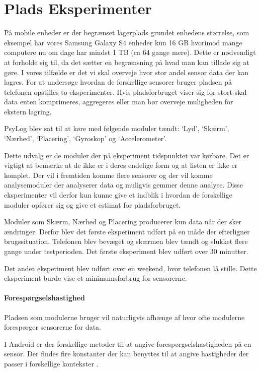 \section{Plads Eksperimenter}
På mobile enheder er der begrænset lagerplads grundet enhedens størrelse, som eksempel har vores Samsung Galaxy S4 enheder kun 16 GB hvorimod mange computere nu om dage har mindst 1 TB (ca 64 gange mere).
Dette er nødvendigt at forholde sig til, da det sætter en begrænsning på hvad man kan tillade sig at gøre.
I vores tilfælde er det vi skal overveje hvor stor andel sensor data der kan lagres.
For at undersøge hvordan de forskellige sensorer bruger pladsen på telefonen opstilles to eksperimenter.
Hvis pladsforbruget viser sig for stort skal data enten komprimeres, aggregeres eller man bør overveje muligheden for ekstern lagring.

PsyLog blev sat til at køre med følgende moduler tændt: `Lyd', `Skærm', `Nærhed', `Placering', `Gyroskop' og `Accelerometer'.

Dette udvalg er de moduler der på eksperiment tidspunktet var kørbare.
Det er vigtigt at bemærke at de ikke er i deres endelige form og at listen er ikke er komplet.
Der vil i fremtiden komme flere sensorer og der vil komme analysemoduler der analyserer data og muligvis gemmer denne analyse.
Disse eksperimenter vil derfor kun kunne give et indblik i hvordan de forskellige moduler opfører sig og give et estimat for pladsforbruget.

Moduler som Skærm, Nærhed og Placering producerer kun data når der sker ændringer. 
Derfor blev det første eksperiment udført på en måde der efterligner brugssituation. 
Telefonen blev bevæget og skærmen blev tændt og slukket flere gange under testperioden.
Det første eksperiment blev udført over 30 minutter.

Det andet eksperiment blev udført over en weekend, hvor telefonen lå stille.
Dette eksperiment burde vise et minimumsforbrug for sensorerne.

\paragraph{Forespørgselshastighed}
Pladsen som modulerne bruger vil naturligvis afhænge af hvor ofte modulerne forespørger sensorerne for data.

I Android er der forskellige metoder til at angive forespørgselshastigheden på en sensor.
Der findes fire konstanter der kan benyttes til at angive hastigheder der passer i forskellige kontekster \cite{sensormonitor}.

